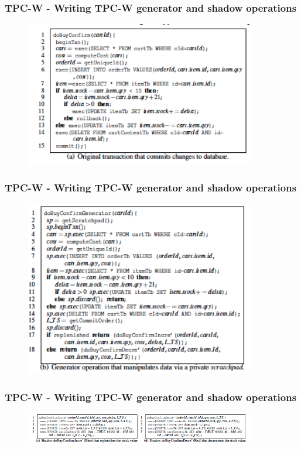\documentclass{beamer}
\begin{document}
\begin{frame}
\frametitle{TPC-W - Writing TPC-W generator and shadow operations}
\begin{figure}[t]
\includegraphics[width=10cm]{pic11.jpg}
\centering
\end{figure}
\end{frame}


\begin{frame}
\frametitle{TPC-W - Writing TPC-W generator and shadow operations}
\begin{figure}[t]
\includegraphics[width=10cm]{pic12.jpg}
\centering
\end{figure}
\end{frame}


\begin{frame}
\frametitle{TPC-W - Writing TPC-W generator and shadow operations}
\begin{figure}[t]
\includegraphics[width=10cm]{pic13.jpg}
\centering
\end{figure}
\end{frame}
\end{document}
